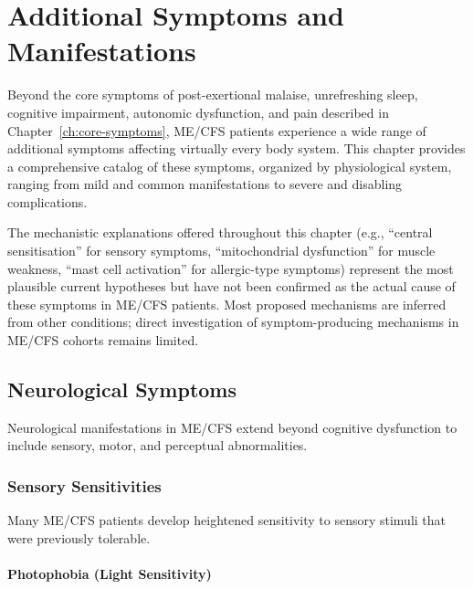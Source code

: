 \chapter{Additional Symptoms and Manifestations}
\label{ch:additional-symptoms}

Beyond the core symptoms of post-exertional malaise, unrefreshing sleep, cognitive impairment, autonomic dysfunction, and pain described in Chapter~\ref{ch:core-symptoms}, ME/CFS patients experience a wide range of additional symptoms affecting virtually every body system. This chapter provides a comprehensive catalog of these symptoms, organized by physiological system, ranging from mild and common manifestations to severe and disabling complications.

\begin{limitation}
The mechanistic explanations offered throughout this chapter (e.g., ``central sensitisation'' for sensory symptoms, ``mitochondrial dysfunction'' for muscle weakness, ``mast cell activation'' for allergic-type symptoms) represent the most plausible current hypotheses but have not been confirmed as the actual cause of these symptoms in ME/CFS patients. Most proposed mechanisms are inferred from other conditions; direct investigation of symptom-producing mechanisms in ME/CFS cohorts remains limited.
\end{limitation}

\section{Neurological Symptoms}
\label{sec:neuro-symptoms}

Neurological manifestations in ME/CFS extend beyond cognitive dysfunction to include sensory, motor, and perceptual abnormalities.

\subsection{Sensory Sensitivities}
\label{subsec:sensory-sensitivities}

Many ME/CFS patients develop heightened sensitivity to sensory stimuli that were previously tolerable.

\subsubsection{Photophobia (Light Sensitivity)}

